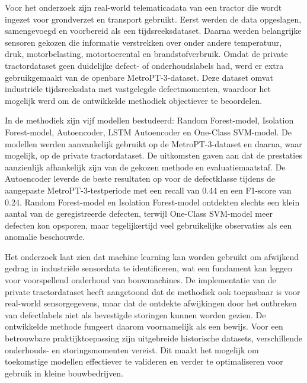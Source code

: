 Voor het onderzoek zijn real-world telematicadata van een tractor die wordt ingezet voor grondverzet en transport gebruikt. Eerst werden de data opgeslagen, samengevoegd en voorbereid als een tijdsreeksdataset. Daarna werden belangrijke sensoren gekozen die informatie verstrekken over onder andere temperatuur, druk, motorbelasting, motortoerental en brandstofverbruik. Omdat de private tractordataset geen duidelijke defect- of onderhoudslabels had, werd er extra gebruikgemaakt van de openbare MetroPT-3-dataset. Deze dataset omvat industriële tijdsreeksdata met vastgelegde defectmomenten, waardoor het mogelijk werd  om de ontwikkelde methodiek objectiever te beoordelen.

In de methodiek zijn vijf modellen bestudeerd: Random Forest-model, Isolation Forest-model, Autoencoder, LSTM Autoencoder en One-Class SVM-model. De modellen werden aanvankelijk gebruikt op de MetroPT-3-dataset en daarna, waar mogelijk, op de private tractordataset. De uitkomsten gaven aan dat de prestaties aanzienlijk afhankelijk zijn van de gekozen methode en evaluatiemaatstaf. De Autoencoder leverde de beste resultaten op voor de defectklasse tijdens de aangepaste MetroPT-3-testperiode met een recall van 0.44 en een F1-score van 0.24. Random Forest-model en Isolation Forest-model ontdekten slechts een klein aantal van de geregistreerde defecten, terwijl One-Class SVM-model meer defecten kon opsporen, maar tegelijkertijd veel gebruikelijke observaties als een anomalie beschouwde.

Het onderzoek laat zien dat machine learning kan worden gebruikt om afwijkend gedrag in industriële sensordata te identificeren, wat een fundament kan leggen voor voorspellend onderhoud van bouwmachines. De implementatie van de private tractordataset heeft aangetoond dat de methodiek ook toepasbaar is voor real-world sensorgegevens, maar dat de ontdekte afwijkingen door het ontbreken van defectlabels niet als bevestigde storingen kunnen worden gezien. De ontwikkelde methode fungeert daarom voornamelijk als een bewijs. Voor een betrouwbare praktijktoepassing zijn uitgebreide historische datasets,  verschillende onderhouds- en storingsmomenten vereist. Dit maakt het mogelijk om toekomstige modellen effectiever te valideren en verder te optimaliseren voor gebruik in kleine bouwbedrijven.


